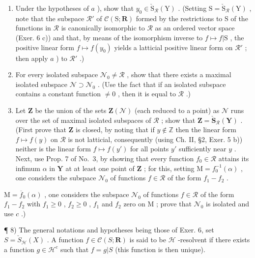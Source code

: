 \begin{enumerate}
\def\labelenumi{\alph{enumi})}
\setcounter{enumi}{1}
\item
  Under the hypotheses of \(a\) ), show that \(y_0 \in \check{\mathrm{S}}_{\mathcal{R}}(\mathrm{Y})\) . (Setting \(\mathrm{S} = \check{\mathrm{S}}_{\mathcal{R}}(\mathrm{Y})\) , note that the subspace \(\mathcal{R}'\) of \(\mathcal{C}(\mathrm{S}; \mathbf{R})\) formed by the restrictions to \(\mathrm{S}\) of the functions in \(\mathcal{R}\) is canonically isomorphic to \(\mathcal{R}\) as an ordered vector space (Exer. 6 c)) and that, by means of the isomorphism inverse to \(f \mapsto f|\mathrm{S}\) , the positive linear form \(f \mapsto f(y_0)\) yields a latticial positive linear form on \(\mathcal{R}'\) ; then apply \(a\) ) to \(\mathcal{R}'\) .)
\item
  For every isolated subspace \(\mathcal{N}_0 \neq \mathcal{R}\) , show that there exists a maximal isolated subspace \(\mathcal{N} \supset \mathcal{N}_0\) . (Use the fact that if an isolated subspace contains a constant function \(\neq 0\) , then it is equal to \(\mathcal{R}\) .)
\item
  Let \(\mathbf{Z}\) be the union of the sets \(\mathbf{Z}(\mathcal{N})\) (each reduced to a point) as \(\mathcal{N}\) runs over the set of maximal isolated subspaces of \(\mathcal{R}\) ; show that \(\mathbf{Z} = \check{\mathbf{S}}_{\mathcal{R}}(\mathbf{Y})\) . (First prove that \(\mathbf{Z}\) is closed, by noting that if \(y \notin \mathbb{Z}\) then the linear form \(f \mapsto f(y)\) on \(\mathcal{R}\) is not latticial, consequently (using Ch. II, §2, Exer. 5 b)) neither is the linear form \(f \mapsto f(y')\) for all points \(y'\) sufficiently near \(y\) . Next, use Prop. 7 of No.~3, by showing that every function \(f_0 \in \mathcal{R}\) attains its infimum \(\alpha\) in \(\mathbf{Y}\) at at least one point of \(\mathbf{Z}\) ; for this, setting \(\mathrm{M} = f_0^{-1}(\alpha)\) , one considers the subspace \(\mathcal{N}_0\) of functions \(f \in \mathcal{R}\) of the form \(f_1 - f_2\) .
\end{enumerate}

\(\mathrm{M} = \overline{f}_0(\alpha)\) , one considers the subspace \(\mathcal{N}_0\) of functions \(f \in \mathcal{R}\) of the form \(f_1 - f_2\) with \(f_1 \geqslant 0\) , \(f_2 \geqslant 0\) , \(f_1\) and \(f_2\) zero on \(\mathrm{M}\) ; prove that \(\mathcal{N}_0\) is isolated and use \(c\) .)

¶ 8) The general notations and hypotheses being those of Exer. 6, set \(S = \check{S}_{\mathcal{H}}(X)\) . A function \(f \in \mathcal{C}(S; \mathbf{R})\) is said to be \(\mathcal{H}\) -resolvent if there exists a function \(g \in \mathcal{H}^c\) such that \(f = g|S\) (this function is then unique).


